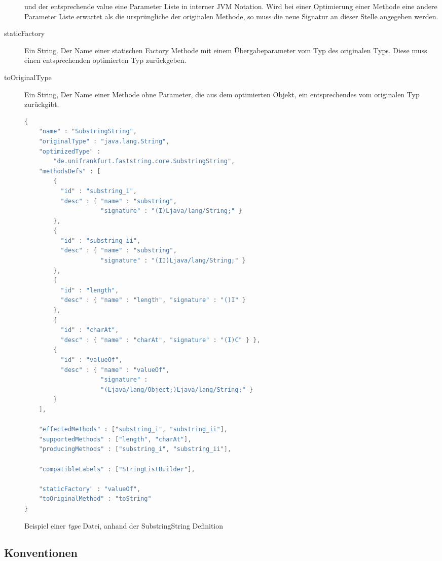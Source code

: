 \begin{description}
	und der entsprechende value eine Parameter Liste in interner JVM Notation. 
	Wird bei einer Optimierung einer Methode eine andere Parameter Liste erwartet
	als die ursprüngliche der originalen Methode, so muss die neue Signatur an dieser
	Stelle angegeben werden.
	\item[staticFactory] Ein String. Der Name einer statischen Factory Methode mit 
	einem Übergabeparameter vom Typ des originalen Typs. Diese muss einen entsprechenden
	optimierten Typ zurückgeben.
	\item[toOriginalType] Ein String, Der Name einer Methode ohne Parameter, die
	aus dem optimierten Objekt, ein entsprechendes vom originalen Typ zurückgibt.

\end{description}

\begin{figure}[H]
	\begin{lstlisting}[language=Java]
{
	"name" : "SubstringString",
	"originalType" : "java.lang.String",
	"optimizedType" : 
		"de.unifrankfurt.faststring.core.SubstringString",
	"methodsDefs" : [
		{ 
		  "id" : "substring_i", 	
		  "desc" : { "name" : "substring", 
		  			 "signature" : "(I)Ljava/lang/String;" } 
		},
		{ 
		  "id" : "substring_ii", 	
		  "desc" : { "name" : "substring", 
		  			 "signature" : "(II)Ljava/lang/String;" } 
		},
		{ 
		  "id" : "length", 			
		  "desc" : { "name" : "length", "signature" : "()I" } 
		},
		{ 
		  "id" : "charAt", 
		  "desc" : { "name" : "charAt", "signature" : "(I)C" } },
		{ 
		  "id" : "valueOf", 
		  "desc" : { "name" : "valueOf", 
		  			 "signature" : 
		  			 "(Ljava/lang/Object;)Ljava/lang/String;" }
		}
	],

	"effectedMethods" : ["substring_i", "substring_ii"],
	"supportedMethods" : ["length", "charAt"],
	"producingMethods" : ["substring_i", "substring_ii"],

	"compatibleLabels" : ["StringListBuilder"],

	"staticFactory" : "valueOf",
	"toOriginalMethod" : "toString"
}
	\end{lstlisting} 
	\caption{Beispiel einer \textit{type} Datei, anhand der SubstringString Definition}\label{typeFile}
\end{figure}


\subsection{Konventionen}\label{subs:conventions}

